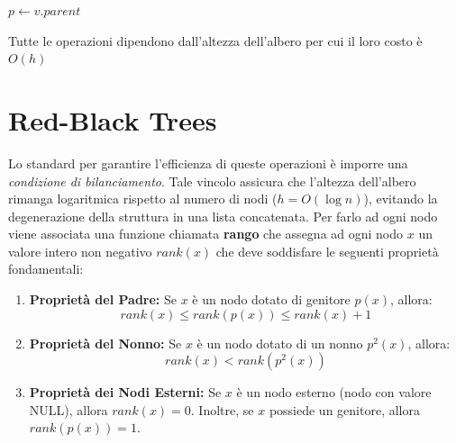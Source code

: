 \begin{algorithm}[H]
    \caption{Cancellazione di un nodo in un BST}
    \label{alg:delete_bst}
    \SetAlgoLined
    \DontPrintSemicolon
    
    
    \BlankLine 
    
    $p \leftarrow v.parent$\;

\end{algorithm}

\begin{kaobox}[frametitle=Note] 
Tutte le operazioni dipendono dall'altezza dell'albero per cui il loro costo è $O(h)$
\end{kaobox}

\section{Red-Black Trees}
Lo standard per garantire l'efficienza di queste operazioni è imporre una \textit{condizione di bilanciamento}. Tale vincolo assicura che l'altezza dell'albero rimanga logaritmica rispetto al numero di nodi ($h = O(\log n)$), evitando la degenerazione della struttura in una lista concatenata.
Per farlo ad ogni nodo viene associata una funzione chiamata \textbf{rango} che assegna ad ogni nodo $x$ un valore intero non negativo $rank(x)$ che deve soddisfare le seguenti proprietà fondamentali:

\begin{enumerate}
    \item \textbf{Proprietà del Padre:} Se $x$ è un nodo dotato di genitore $p(x)$, allora:
    \[ rank(x) \leq rank(p(x)) \leq rank(x) + 1 \]
    \item \textbf{Proprietà del Nonno:} Se $x$ è un nodo dotato di un nonno $p^2(x)$, allora:
    \[ rank(x) < rank(p^2(x)) \]
    \item \textbf{Proprietà dei Nodi Esterni:} Se $x$ è un nodo esterno (nodo con valore NULL), allora $rank(x) = 0$. Inoltre, se $x$ possiede un genitore, allora $rank(p(x)) = 1$.
\end{enumerate}

